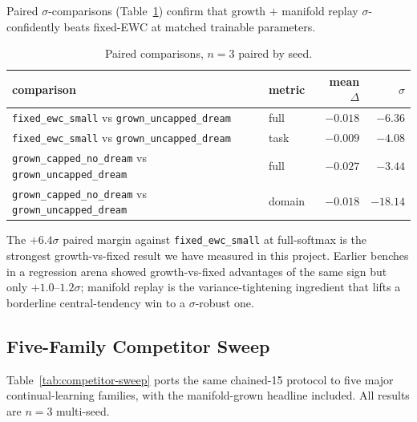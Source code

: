 \documentclass[11pt]{article}
\newcommand{\arm}[1]{\texttt{#1}}
\begin{document}
Paired $\sigma$-comparisons (Table~\ref{tab:trioron-paired}) confirm that
growth $+$ manifold replay $\sigma$-confidently beats fixed-EWC at matched
trainable parameters.

\begin{table}[h]
  \centering
  \caption{Paired comparisons, $n = 3$ paired by seed.}
  \label{tab:trioron-paired}
  \begin{tabular}{llrr}
    \toprule
    comparison                                                                  & metric  & mean $\Delta$ & $\sigma$    \\
    \midrule
    \arm{fixed\_ewc\_small} vs \arm{grown\_uncapped\_dream}                     & full    & $-0.018$      & $-6.36$     \\
    \arm{fixed\_ewc\_small} vs \arm{grown\_uncapped\_dream}                     & task    & $-0.009$      & $-4.08$     \\
    \arm{grown\_capped\_no\_dream} vs \arm{grown\_uncapped\_dream}              & full    & $-0.027$      & $-3.44$     \\
    \arm{grown\_capped\_no\_dream} vs \arm{grown\_uncapped\_dream}              & domain  & $-0.018$      & $-18.14$    \\
    \bottomrule
  \end{tabular}
\end{table}

The $+6.4\sigma$ paired margin against \arm{fixed\_ewc\_small} at
full-softmax is the strongest growth-vs-fixed result we have measured in
this project. Earlier benches in a regression arena showed
growth-vs-fixed advantages of the same sign but only $+1.0$--$1.2\sigma$;
manifold replay is the variance-tightening ingredient that lifts a
borderline central-tendency win to a $\sigma$-robust one.

\subsection{Five-Family Competitor Sweep}
\label{sec:competitor-sweep}

Table~\ref{tab:competitor-sweep} ports the same chained-15 protocol to
five major continual-learning families, with the manifold-grown headline
included. All results are $n = 3$ multi-seed.
\end{document}

